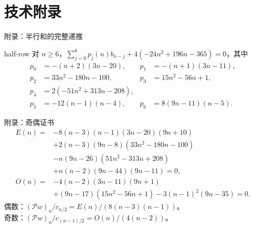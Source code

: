 \documentclass{beamer}
\begin{document}
\section{技术附录}
\begin{frame}{附录：半行和的完整递推}
\small
\begin{bookresult}{half-row}
对 $n\ge6$，$\sum_{j=0}^6p_j(n)b_{n-j}+4(-24n^2+196n-365)=0$，其中
\[
\begin{aligned}
p_0&=-(n+2)(3n-20),&p_1&=-(n+1)(3n-11),\\
p_2&=33n^2-180n-100,&p_3&=15n^2-56n+1,\\
p_4&=2(-51n^2+313n-208),\\
p_5&=-12(n-1)(n-4),&p_6&=8(9n-11)(n-5).
\end{aligned}
\]
\end{bookresult}
\end{frame}
\begin{frame}{附录：奇偶证书}
\footnotesize
\[
\begin{aligned}
E(n)={}&-8(n-3)(n-1)(3n-20)(9n+10)\\
&+2(n-3)(9n-8)(33n^2-180n-100)\\
&-n(9n-26)(51n^2-313n+208)\\
&+n(n-2)(9n-44)(9n-11)=0,\\
O(n)={}&-4(n-2)(3n-11)(9n+1)\\
&+(9n-17)(15n^2-56n+1)-3(n-1)^2(9n-35)=0.
\end{aligned}
\]
偶数：$(\mathcal Pw)_n/c_{n/2}=E(n)/(8(n-3)(n-1))$。\\
奇数：$(\mathcal Pw)_n/c_{(n-1)/2}=O(n)/(4(n-2))$。
\end{frame}
\end{document}
